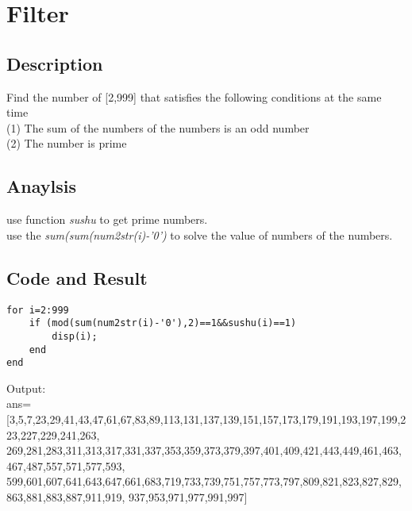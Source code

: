 \documentclass[UTF8,a4paper]{article}
\begin{document}
\section{Filter}
\subsection{Description}
\noindent Find the number of [2,999] that satisfies the following conditions at the same time\\
(1) The sum of the numbers of the numbers is an odd number\\
(2) The number is prime
\subsection{Anaylsis}
\noindent use function \textit{sushu} to get prime numbers.\\
use the \textit{sum(sum(num2str(i)-'0')} to solve the value of numbers of the numbers.
\subsection{Code and Result}
\begin{lstlisting}
for i=2:999
    if (mod(sum(num2str(i)-'0'),2)==1&&sushu(i)==1)
        disp(i);
    end
end
\end{lstlisting}
Output:\\
ans=
[3,5,7,23,29,41,43,47,61,67,83,89,113,131,137,139,151,157,173,179,191,193,197,199,223,227,229,241,263,
269,281,283,311,313,317,331,337,353,359,373,379,397,401,409,421,443,449,461,463,467,487,557,571,577,593,
599,601,607,641,643,647,661,683,719,733,739,751,757,773,797,809,821,823,827,829,863,881,883,887,911,919,
937,953,971,977,991,997]
\end{document}
